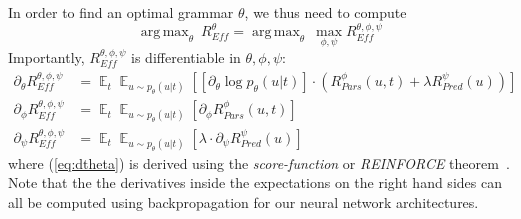 \documentclass[10pt,twoside,lineno]{article}
\DeclareMathOperator*{\argmax}{arg\,max}
\DeclareMathOperator{\E}{\mathop{\mathbb{E}}}
\begin{document}
%
%
In order to find an optimal grammar $\theta$, we thus need to compute 
\begin{equation}\label{eq:efficiency}
\argmax_\theta\	R_{\textit{Eff}}^{\theta} = \argmax_\theta\	\max_{\phi, \psi} R_{\textit{Eff}}^{\theta, \phi, \psi} 
\end{equation}
Importantly, $R_{\textit{Eff}}^{\theta, \phi, \psi}$ is differentiable in $\theta, \phi, \psi$: %
\begin{align}
\partial_\theta R_{\textit{Eff}}^{\theta, \phi, \psi} &= \E_t \E_{u \sim p_\theta(u|t)} \left[  \left[\partial_\theta \log p_\theta(u|t)\right] \cdot    \left(R_{Pars}^{\phi}(u,t) + \lambda R_{Pred}^{\psi}(u)\right) \right] \label{eq:dtheta}\\ 
\partial_\phi R_{\textit{Eff}}^{\theta, \phi, \psi} &= \E_t \E_{u \sim p_\theta(u|t)}  \left[\partial_\phi R_{Pars}^{\phi}(u,t)\right] \\
\partial_\psi R_{\textit{Eff}}^{\theta, \phi, \psi} &= \E_t \E_{u \sim p_\theta(u|t)}  \left[\lambda \cdot \partial_\psi R_{Pred}^{\psi}(u)\right] \label{eq:dpsi}
\end{align}
where (\ref{eq:dtheta}) is derived using the \emph{score-function} or \emph{REINFORCE} theorem~\cite{williams1992simple}.
Note that the the derivatives inside the expectations on the right hand sides can all be computed using backpropagation for our neural network architectures.
\end{document}
